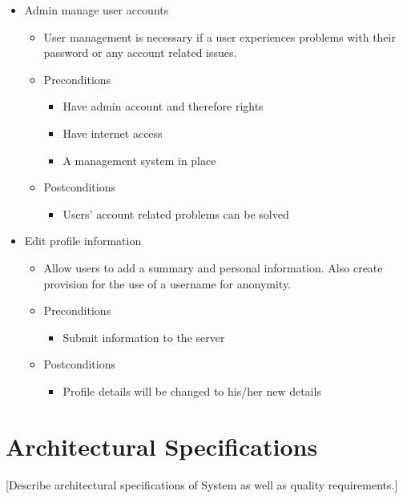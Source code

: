 \documentclass{article}
\begin{document}
\begin{itemize}
				\item Admin manage user accounts
				\begin{itemize}
					\item User management is necessary if a user experiences problems with their password or any account related issues.
					\item Preconditions
					\begin{itemize}
						\item Have admin account and therefore rights
						\item Have internet access
						\item A management system in place
					\end{itemize}
					\item Postconditions
					\begin{itemize}
						\item Users’ account related problems can be solved
					\end{itemize}
                \end{itemize}
           
			
				\item Edit profile information
				\begin{itemize}
					\item Allow users to add a summary and personal information. Also create provision for the use of a username for anonymity.
					\item Preconditions
					\begin{itemize}
						\item Submit information to the server
					\end{itemize}
					\item Postconditions
					\begin{itemize}
						\item Profile details will be changed to his/her new details
					\end{itemize}
					\end{itemize}
				\end{itemize}
           			
  \section{Architectural Specifications}
   [Describe architectural specifications of System as well as quality requirements.]
\end{document}
